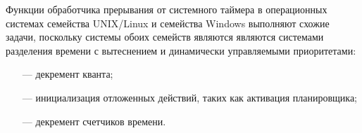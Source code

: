 Функции обработчика прерывания от системного таймера в операционных системах семейства UNIX/Linux и семейства Windows выполняют схожие задачи, поскольку системы обоих семейств являются являются системами разделения времени с вытеснением и динамически управляемыми приоритетами:

\begin{itemize}
	\item[---] декремент кванта;
	\item[---] инициализация отложенных действий, таких как активация планировщика;
	\item[---] декремент счетчиков времени.
\end{itemize}